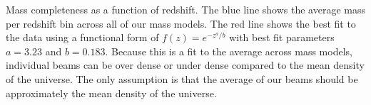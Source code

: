 \label{fig:mass_complete} Mass completeness as a function of redshift. The blue line shows the average mass per redshift bin across all of our mass models. The red line shows the best fit to the data using a functional form of $f(z) = e^{-z^a / b}$ with best fit parameters $a = 3.23$ and $b = 0.183$. Because this is a fit to the average across mass models, individual beams can be over dense or under dense compared to the mean density of the universe. The only assumption is that the average of our beams should be approximately the mean density of the universe.
  